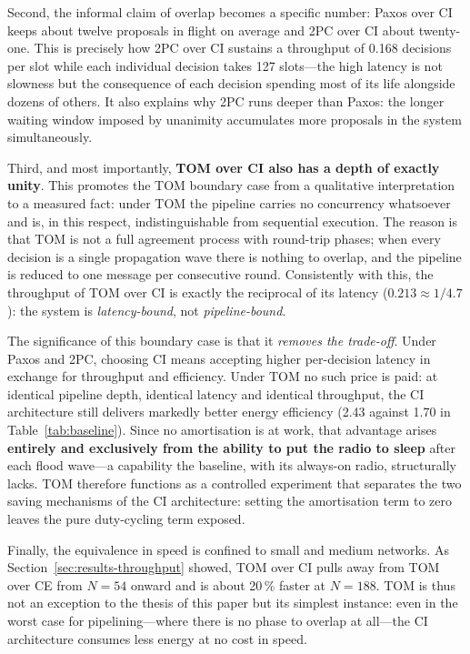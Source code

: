\documentclass[journal]{IEEEtran}
\newcommand{\CI}{CI}                      %
\newcommand{\CE}{CE}                      %
\newcommand{\Nnodes}{N}                   %
\begin{document}
Second, the informal claim of overlap becomes a specific number: Paxos
over \CI{} keeps about twelve proposals in flight on average and 2PC over
\CI{} about twenty-one. This is precisely how 2PC over \CI{} sustains a
throughput of 0.168 decisions per slot while each individual decision
takes 127 slots---the high latency is not slowness but the consequence of
each decision spending most of its life alongside dozens of others. It
also explains why 2PC runs deeper than Paxos: the longer waiting window
imposed by unanimity accumulates more proposals in the system
simultaneously.

Third, and most importantly, \textbf{TOM over \CI{} also has a depth of
exactly unity}. This promotes the TOM boundary case from a qualitative
interpretation to a measured fact: under TOM the pipeline carries no
concurrency whatsoever and is, in this respect, indistinguishable from
sequential execution. The reason is that TOM is not a full agreement
process with round-trip phases; when every decision is a single
propagation wave there is nothing to overlap, and the pipeline is reduced
to one message per consecutive round. Consistently with this, the
throughput of TOM over \CI{} is exactly the reciprocal of its latency
($0.213 \approx 1/4.7$): the system is \emph{latency-bound}, not
\emph{pipeline-bound}.

The significance of this boundary case is that it \emph{removes the
trade-off}. Under Paxos and 2PC, choosing \CI{} means accepting higher
per-decision latency in exchange for throughput and efficiency. Under TOM
no such price is paid: at identical pipeline depth, identical latency and
identical throughput, the \CI{} architecture still delivers markedly
better energy efficiency (2.43 against 1.70 in
Table~\ref{tab:baseline}). Since no amortisation is at work, that
advantage arises \textbf{entirely and exclusively from the ability to put
the radio to sleep} after each flood wave---a capability the baseline,
with its always-on radio, structurally lacks. TOM therefore functions as a
controlled experiment that separates the two saving mechanisms of the
\CI{} architecture: setting the amortisation term to zero leaves the pure
duty-cycling term exposed.

Finally, the equivalence in speed is confined to small and medium
networks. As Section~\ref{sec:results-throughput} showed, TOM over \CI{}
pulls away from TOM over \CE{} from $\Nnodes = 54$ onward and is about
20\,\% faster at $\Nnodes = 188$. TOM is thus not an exception to the
thesis of this paper but its simplest instance: even in the worst case for
pipelining---where there is no phase to overlap at all---the \CI{}
architecture consumes less energy at no cost in speed.
\end{document}
